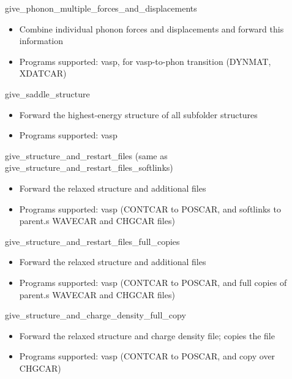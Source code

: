 \documentclass[letterpaper,10pt,english]{sphinxmanual}
\begin{document}
give\_phonon\_multiple\_forces\_and\_displacements
\begin{itemize}
\item {} 
Combine individual phonon forces and displacements and forward this information

\item {} 
Programs supported: vasp, for vasp-to-phon transition (DYNMAT, XDATCAR)

\end{itemize}

give\_saddle\_structure
\begin{itemize}
\item {} 
Forward the highest-energy structure of all subfolder structures

\item {} 
Programs supported: vasp

\end{itemize}

give\_structure\_and\_restart\_files (same as give\_structure\_and\_restart\_files\_softlinks)
\begin{itemize}
\item {} 
Forward the relaxed structure and additional files

\item {} 
Programs supported: vasp (CONTCAR to POSCAR, and softlinks to parent.s WAVECAR and CHGCAR files)

\end{itemize}

give\_structure\_and\_restart\_files\_full\_copies
\begin{itemize}
\item {} 
Forward the relaxed structure and additional files

\item {} 
Programs supported: vasp (CONTCAR to POSCAR, and full copies of parent.s WAVECAR and CHGCAR files)

\end{itemize}

give\_structure\_and\_charge\_density\_full\_copy
\begin{itemize}
\item {} 
Forward the relaxed structure and charge density file; copies the file

\item {} 
Programs supported: vasp (CONTCAR to POSCAR, and copy over CHGCAR)

\end{itemize}
\end{document}
